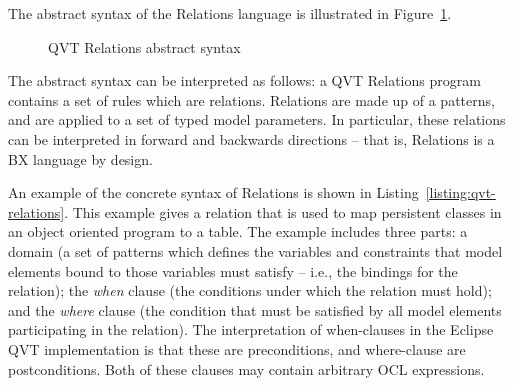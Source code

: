 The abstract syntax of the Relations language is illustrated in Figure~\ref{fig:qvt-as}.

\begin{figure}[htbp]
\label{fig:qvt-as}
\caption{QVT Relations abstract syntax}
\end{figure}

The abstract syntax can be interpreted as follows: a QVT Relations program contains a set of rules which are relations. Relations are made up of a patterns, and are applied to a set of typed model parameters. In particular, these relations can be interpreted in forward and backwards directions -- that is, Relations is a BX language by design.

An example of the concrete syntax of Relations is shown in Listing~\ref{listing:qvt-relations}. This example gives a relation that is used to map persistent classes in an object oriented program to a table. The example includes three parts: a domain (a set of patterns which defines the variables and constraints that model elements bound to those variables must satisfy -- i.e., the bindings for the relation); the \textit{when} clause (the conditions under which the relation must hold); and the \textit{where} clause (the condition that must be satisfied by all model elements participating in the relation). The interpretation of when-clauses in the Eclipse QVT implementation is that these are preconditions, and where-clause are postconditions. Both of these clauses may contain arbitrary OCL expressions.

